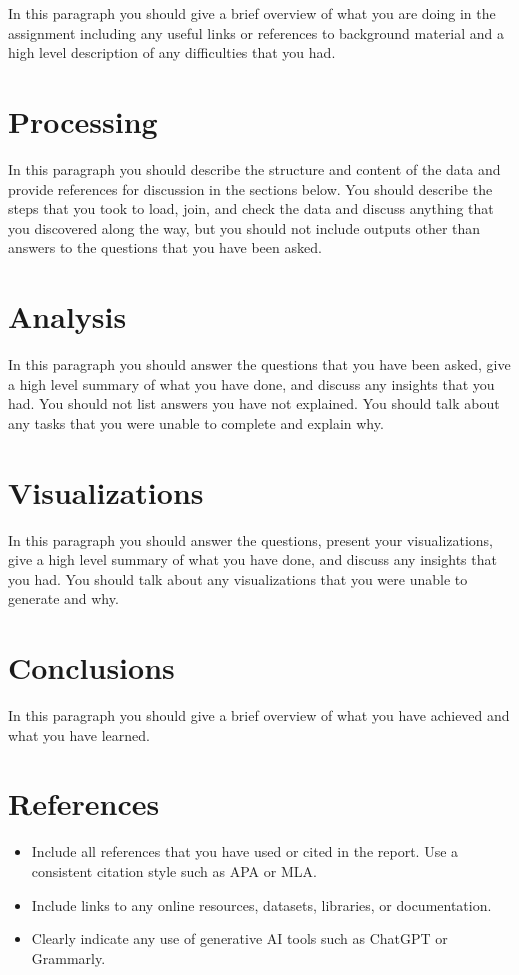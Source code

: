 \documentclass[11pt]{article}
\begin{document}
In this paragraph you should give a brief overview of what you are doing in the assignment including any useful links or references to background material and a high level description of any difficulties that you had.

\section{Processing}

In this paragraph you should describe the structure and content of the data and provide references for discussion in the sections below. You should describe the steps that you took to load, join, and check the data and discuss anything that you discovered along the way, but you should not include outputs other than answers to the questions that you have been asked.

\section{Analysis}

In this paragraph you should answer the questions that you have been asked, give a high level summary of what you have done, and discuss any insights that you had. You should not list answers you have not explained. You should talk about any tasks that you were unable to complete and explain why.

\section{Visualizations}

In this paragraph you should answer the questions, present your visualizations, give a high level summary of what you have done, and discuss any insights that you had. You should talk about any visualizations that you were unable to generate and why.

\section{Conclusions}

In this paragraph you should give a brief overview of what you have achieved and what you have learned.

\section{References}

\begin{itemize}
    \item Include all references that you have used or cited in the report. Use a consistent citation style such as APA or MLA.
    \item Include links to any online resources, datasets, libraries, or documentation.
    \item Clearly indicate any use of generative AI tools such as ChatGPT or Grammarly.
\end{itemize}











\printbibliography

\newpage

\begin{appendices}

\end{appendices}
\end{document}
